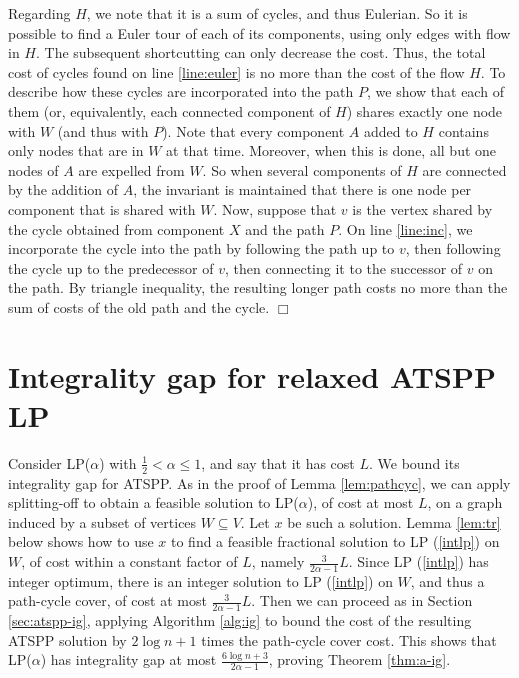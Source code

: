 \documentclass[11pt]{article}
\newcommand{\qed}{\hspace*{\fill}$\Box$}
\newenvironment{proofof}[1]{\medskip \noindent {\bf{Proof of #1. }}}{\qed}
\begin{document}
\begin{proofof}{Theorem \ref{thm:ig}}
Regarding $H$, we note that it is a sum of cycles, and thus Eulerian. So it is possible to find a 
Euler tour of each of its components, using only edges with flow in $H$. The subsequent shortcutting 
can only decrease the cost. Thus, the total cost of cycles found on line \ref{line:euler} is no more 
than the cost of the flow $H$. To describe how these cycles are incorporated into the path $P$, we 
show that each of them (or, equivalently, each connected component of $H$) shares exactly one node with $W$ (and thus with $P$). Note that every  component $A$ added to $H$ contains only 
nodes that are in $W$ at that time. Moreover, when this is done, all but one nodes of $A$ are 
expelled from $W$. So when several components of $H$ are connected by the addition of $A$, the 
invariant is maintained that there is one node per component that is shared with $W$. Now, 
suppose that $v$ is the vertex shared by the cycle obtained from component $X$ and the path $P$. 
On line \ref{line:inc}, we incorporate the cycle into the path by following the path up to $v$, 
then following the cycle up to the predecessor of $v$, then connecting it to the successor of $v$ 
on the path. By triangle inequality, the resulting longer path costs no more than the sum of costs 
of the old path and the cycle.
\end{proofof}




\section{Integrality gap for relaxed ATSPP LP} \label{sec:atspp-alpha1}

Consider LP($\alpha$) 
with $\frac{1}{2} < \alpha \leq 1$, and say that it has cost $L$. We bound its integrality gap for ATSPP. 
As in the proof of Lemma \ref{lem:pathcyc}, we can apply splitting-off to obtain a feasible solution 
to LP($\alpha$), of cost at most $L$, on a graph induced by a subset of vertices $W\subseteq V$. 
Let $x$ be such a solution. Lemma \ref{lem:tr} below shows how to use $x$ to find a feasible fractional 
solution to LP (\ref{intlp}) on $W$, of cost within a constant factor of $L$, namely $\frac{3}{2\alpha-1} L$. 
Since LP (\ref{intlp}) has integer optimum, there is an integer solution to  LP (\ref{intlp}) on $W$, and thus a path-cycle cover,  
of cost at most $\frac{3}{2\alpha-1} L$. Then we can proceed as in Section \ref{sec:atspp-ig}, applying Algorithm \ref{alg:ig} to bound the cost of the resulting ATSPP solution by $2\log n +1$ times the path-cycle cover cost. This shows that LP($\alpha$) has integrality gap at most 
$\frac{6\log n +3}{2\alpha-1}$, proving Theorem \ref{thm:a-ig}.
\end{document}
